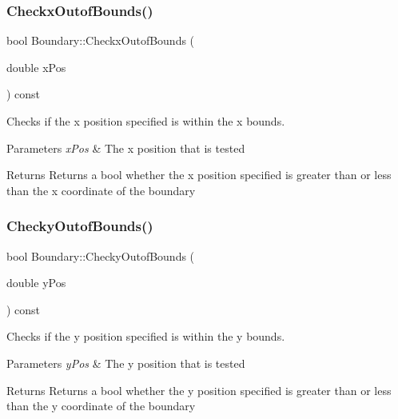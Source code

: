 \subsubsection{\texorpdfstring{Checkx\+Outof\+Bounds()}{CheckxOutofBounds()}}
{\footnotesize\ttfamily bool Boundary\+::\+Checkx\+Outof\+Bounds (\begin{DoxyParamCaption}\item[{double}]{x\+Pos }\end{DoxyParamCaption}) const\hspace{0.3cm}{\ttfamily [private]}}



Checks if the x position specified is within the x bounds. 


\begin{DoxyParams}{Parameters}
{\em x\+Pos} & The x position that is tested \\
\hline
\end{DoxyParams}
\begin{DoxyReturn}{Returns}
Returns a bool whether the x position specified is greater than or less than the x coordinate of the boundary 
\end{DoxyReturn}
\mbox{\label{class_boundary_a5063de08946b8303ddeff4c2b72e202e}} 
\subsubsection{\texorpdfstring{Checky\+Outof\+Bounds()}{CheckyOutofBounds()}}
{\footnotesize\ttfamily bool Boundary\+::\+Checky\+Outof\+Bounds (\begin{DoxyParamCaption}\item[{double}]{y\+Pos }\end{DoxyParamCaption}) const\hspace{0.3cm}{\ttfamily [private]}}



Checks if the y position specified is within the y bounds. 


\begin{DoxyParams}{Parameters}
{\em y\+Pos} & The y position that is tested \\
\hline
\end{DoxyParams}
\begin{DoxyReturn}{Returns}
Returns a bool whether the y position specified is greater than or less than the y coordinate of the boundary 
\end{DoxyReturn}
\mbox{\label{class_boundary_ae307f83cb40ccaa89e37f58d007c4e6b}} 
